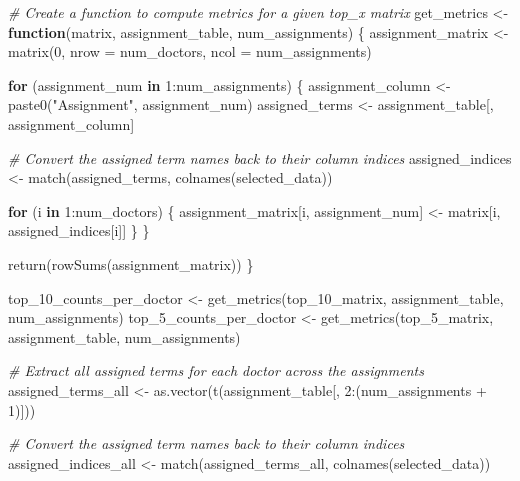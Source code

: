 \documentclass[
]{article}
\newenvironment{Shaded}{\begin{snugshade}}{\end{snugshade}}
\newcommand{\AttributeTok}[1]{\textcolor[rgb]{0.77,0.63,0.00}{#1}}
\newcommand{\CommentTok}[1]{\textcolor[rgb]{0.56,0.35,0.01}{\textit{#1}}}
\newcommand{\ControlFlowTok}[1]{\textcolor[rgb]{0.13,0.29,0.53}{\textbf{#1}}}
\newcommand{\DecValTok}[1]{\textcolor[rgb]{0.00,0.00,0.81}{#1}}
\newcommand{\FunctionTok}[1]{\textcolor[rgb]{0.00,0.00,0.00}{#1}}
\newcommand{\NormalTok}[1]{#1}
\newcommand{\OtherTok}[1]{\textcolor[rgb]{0.56,0.35,0.01}{#1}}
\newcommand{\SpecialCharTok}[1]{\textcolor[rgb]{0.00,0.00,0.00}{#1}}
\newcommand{\StringTok}[1]{\textcolor[rgb]{0.31,0.60,0.02}{#1}}
\begin{document}
\begin{Shaded}
\begin{Highlighting}[]
\CommentTok{\# Create a function to compute metrics for a given top\_x matrix}
\NormalTok{get\_metrics }\OtherTok{\textless{}{-}} \ControlFlowTok{function}\NormalTok{(matrix, assignment\_table, num\_assignments) \{}
\NormalTok{  assignment\_matrix }\OtherTok{\textless{}{-}} \FunctionTok{matrix}\NormalTok{(}\DecValTok{0}\NormalTok{, }\AttributeTok{nrow =}\NormalTok{ num\_doctors, }\AttributeTok{ncol =}\NormalTok{ num\_assignments)}
  
  \ControlFlowTok{for}\NormalTok{ (assignment\_num }\ControlFlowTok{in} \DecValTok{1}\SpecialCharTok{:}\NormalTok{num\_assignments) \{}
\NormalTok{    assignment\_column }\OtherTok{\textless{}{-}} \FunctionTok{paste0}\NormalTok{(}\StringTok{"Assignment"}\NormalTok{, assignment\_num)}
\NormalTok{    assigned\_terms }\OtherTok{\textless{}{-}}\NormalTok{ assignment\_table[, assignment\_column]}
    
    \CommentTok{\# Convert the assigned term names back to their column indices}
\NormalTok{    assigned\_indices }\OtherTok{\textless{}{-}} \FunctionTok{match}\NormalTok{(assigned\_terms, }\FunctionTok{colnames}\NormalTok{(selected\_data))}
    
    \ControlFlowTok{for}\NormalTok{ (i }\ControlFlowTok{in} \DecValTok{1}\SpecialCharTok{:}\NormalTok{num\_doctors) \{}
\NormalTok{      assignment\_matrix[i, assignment\_num] }\OtherTok{\textless{}{-}}\NormalTok{ matrix[i, assigned\_indices[i]]}
\NormalTok{    \}}
\NormalTok{  \}}
  
  \FunctionTok{return}\NormalTok{(}\FunctionTok{rowSums}\NormalTok{(assignment\_matrix))}
\NormalTok{\}}

\NormalTok{top\_10\_counts\_per\_doctor }\OtherTok{\textless{}{-}} \FunctionTok{get\_metrics}\NormalTok{(top\_10\_matrix, assignment\_table, num\_assignments)}
\NormalTok{top\_5\_counts\_per\_doctor }\OtherTok{\textless{}{-}} \FunctionTok{get\_metrics}\NormalTok{(top\_5\_matrix, assignment\_table, num\_assignments)}

\CommentTok{\# Extract all assigned terms for each doctor across the assignments}
\NormalTok{assigned\_terms\_all }\OtherTok{\textless{}{-}} \FunctionTok{as.vector}\NormalTok{(}\FunctionTok{t}\NormalTok{(assignment\_table[, }\DecValTok{2}\SpecialCharTok{:}\NormalTok{(num\_assignments }\SpecialCharTok{+} \DecValTok{1}\NormalTok{)]))}

\CommentTok{\# Convert the assigned term names back to their column indices}
\NormalTok{assigned\_indices\_all }\OtherTok{\textless{}{-}} \FunctionTok{match}\NormalTok{(assigned\_terms\_all, }\FunctionTok{colnames}\NormalTok{(selected\_data))}


\end{Highlighting}
\end{Shaded}
\end{document}
